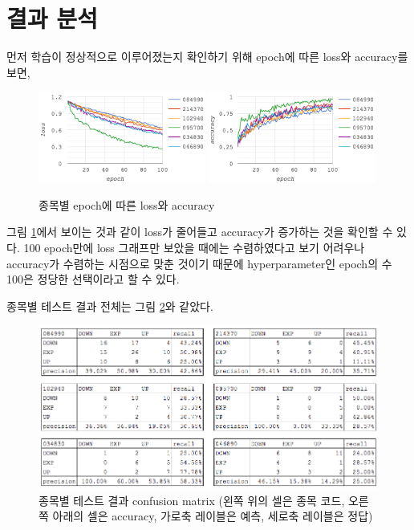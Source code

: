 \documentclass[a4paper,10pt]{article}
\begin{document}
\section{결과 분석}

먼저 학습이 정상적으로 이루어졌는지 확인하기 위해 epoch에 따른 loss와 accuracy를 보면,
\begin{figure}[h]
\includegraphics[width=0.49\textwidth]{epoch_loss}
\includegraphics[width=0.49\textwidth]{epoch_accuracy}
\centering
\caption{종목별 epoch에 따른 loss와 accuracy}
\label{fig:epoch_loss_accuracy}
\end{figure}
그림 \ref{fig:epoch_loss_accuracy}에서 보이는 것과 같이 loss가 줄어들고 accuracy가 증가하는 것을 확인할 수 있다.
100 epoch만에 loss 그래프만 보았을 때에는 수렴하였다고 보기 어려우나 accuracy가 수렴하는 시점으로 맞춘 것이기 때문에
hyperparameter인 epoch의 수 100은 정당한 선택이라고 할 수 있다.

종목별 테스트 결과 전체는 그림 \ref{fig:test_result}와 같았다.
\begin{figure}[h]
\includegraphics[width=\textwidth]{test_result}
\centering
\caption{종목별 테스트 결과 confusion matrix (왼쪽 위의 셀은 종목 코드, 오른쪽 아래의 셀은 accuracy, 가로축 레이블은 예측, 세로축 레이블은 정답)}
\label{fig:test_result}
\end{figure}
\end{document}
